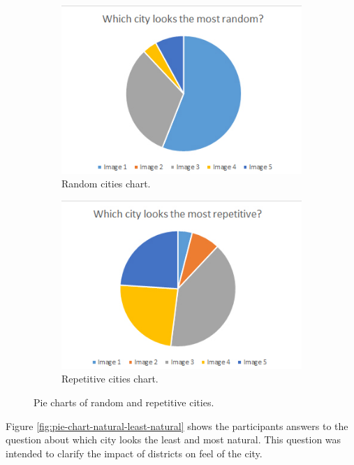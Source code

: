 \begin{figure}[h]
	\begin{subfigure}{0.5\textwidth}
		\centering
		\includegraphics[width=0.95\linewidth]{"Images/Random"}
		\caption{Random cities chart.}
		\label{fig:pie-chart-random}
	\end{subfigure}
	\begin{subfigure}{0.5\textwidth}
		\centering
		\includegraphics[width=0.95\linewidth]{"Images/Repetitive"}
		\caption{Repetitive cities chart.}
		\label{fig:pie-chart-repetitive}
	\end{subfigure}
	\caption{Pie charts of random and repetitive cities.}
	\label{fig:pie-chart-random-repetitive}
\end{figure}

Figure \ref{fig:pie-chart-natural-least-natural} shows the participants answers to the question about which city looks the least and most natural. This question was intended to clarify the impact of districts on feel of the city.

